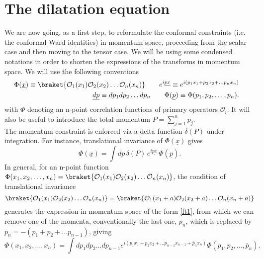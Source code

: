 \documentclass[a4paper,11pt,openright,twoside]{book}
\numberwithin{equation}{section}
\begin{document}
\section{The dilatation equation}\label{dilMom}
We are now going, as a first step, to reformulate the conformal constraints (i.e. the conformal Ward identities) in  momentum space, proceeding from the scalar case and then moving to the tensor case.
We will be using some condensed notations in order to shorten the expressions 
of the transforms in momentum space. We will use the following conventions
\begin{eqnarray}
	\label{conv}
	&& \Phi(\underline{x})\equiv \braket{\mathcal{O}_1(x_1)\mathcal{O}_2(x_2)\ldots \mathcal{O}_n(x_n)} \qquad e^{i \underline{p x}}\equiv e^{i(p_1 x_1 + p_2 x_2 + \ldots p_n x_n)} \qquad \nonumber\\
	&& \underline{d p}\equiv dp_1 dp_2 \ldots d p_n \qquad 
	\Phi(\underline{p})\equiv \Phi(p_1,p_2,\ldots, p_n).\qquad 
\end{eqnarray}
with $\Phi$ denoting an n-point correlation functions of primary operators $\mathcal{O}_i$.
It will also be useful to introduce the total momentum $P=\sum_{j=1}^{n} p_j$.\\
The momentum constraint is enforced via a delta function $\delta(P)$ under integration. For instance, translational invariance of $\Phi(\underline{x})$ gives 
\begin{equation}
	\label{ft1}
	\Phi(\underline{x})=\int \underline{dp}\,\delta(P) \,e^{i\underline{p x}} \,\Phi(\underline{p}).
\end{equation}
In general, for an n-point function $\Phi(x_1,x_2,\ldots, x_n)=\braket{\mathcal{O}_1(x_1)\mathcal{O}_2(x_2)\ldots \mathcal{O}_n(x_n)} $, the condition of translational invariance  
\begin{equation}
	\braket{\mathcal{O}_1(x_1)\mathcal{O}_2(x_2)\ldots \mathcal{O}_n(x_n)}= \braket{\mathcal{O}_1(x_1+a)\mathcal{O}_2(x_2+a)\ldots \mathcal{O}_n(x_n+a)}
\end{equation}
generates the expression in momentum space of the form \eqref{ft1}, from which we can remove one of the momenta, conventionally the last one, $p_n$, which is replaced by 
$\overline{p}_n=-(p_1+p_2 +\ldots p_{n-1})$, giving
\begin{equation}
	\Phi(x_1,x_2,\ldots,x_n)=\int dp_1 dp_2... dp_{n-1}e^{i(p_1 x_1 + p_2 x_2 +...p_{n-1} x_{n-1} + 
		\overline{p}_n x_n)}\Phi(p_1,p_2,\ldots,\overline{p}_n).
\end{equation}
\end{document}
